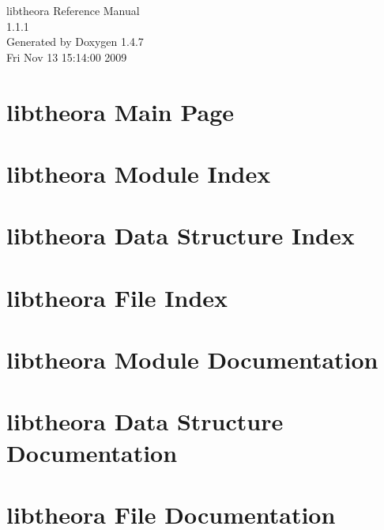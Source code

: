 \documentclass[a4paper]{book}
\begin{document}
\begin{titlepage}
\vspace*{7cm}
\begin{center}
{\Large libtheora Reference Manual\\[1ex]\large 1.1.1 }\\
\vspace*{1cm}
{\large Generated by Doxygen 1.4.7}\\
\vspace*{0.5cm}
{\small Fri Nov 13 15:14:00 2009}\\
\end{center}
\end{titlepage}
\clearemptydoublepage
{}
\tableofcontents
\clearemptydoublepage
{}
\chapter{libtheora Main Page}
\label{index}
\chapter{libtheora Module Index}

\chapter{libtheora Data Structure Index}

\chapter{libtheora File Index}

\chapter{libtheora Module Documentation}




\chapter{libtheora Data Structure Documentation}











\chapter{libtheora File Documentation}




\printindex
\end{document}
